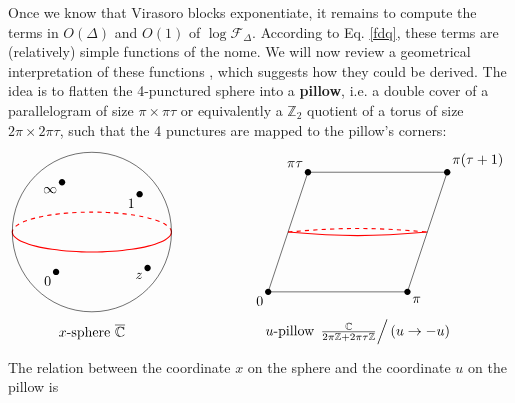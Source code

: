 \documentclass[12pt, a4paper]{article}
\newcommand{\myindex}[1]{\textbf{\boldmath #1}}
\begin{document}
Once we know that Virasoro blocks exponentiate, it remains to compute the terms in $O(\Delta)$ and $O(1)$ of $\log \mathcal{F}_\Delta$. According to Eq. \eqref{fdq}, these terms are (relatively) simple functions of the nome. We will now review a geometrical interpretation of these functions \cite{msz15}, which suggests how they could be derived. The idea is to flatten the 4-punctured sphere into a \myindex{pillow}, i.e. a double cover of a parallelogram of size $\pi\times \pi \tau$ or equivalently a $\mathbb{Z}_2$ quotient of a torus of size $2\pi\times 2\pi\tau$, such that the 4 punctures are mapped to the pillow's corners:
\begin{align}
 \begin{tikzpicture}[scale = .5, baseline=(base)]
 \coordinate (base) at (0, 0);
  \draw [thick, red] plot [domain = 0:-180, smooth] ({4*cos(\x)}, {sin(\x)});
  \draw [thick, red, dashed] plot [domain = 0:180, smooth] ({4*cos(\x)}, {sin(\x)});
  \draw (0, 0) circle [radius = 4];
  \draw (-1.8,-2) node [fill, circle, minimum size = 1.6mm, inner sep = 0]{} node[below left] {$0$};
  \draw (2.8, -1.8) node [fill, circle, minimum size = 1.6mm, inner sep = 0]{} node[below left] {$z$};
  \draw (-1.5, 2.5) node [fill, circle, minimum size = 1.6mm, inner sep = 0]{} node[below left] {$\infty$};
  \draw (2.4, 1.9) node [fill, circle, minimum size = 1.6mm, inner sep = 0]{} node[below left] {$1$};
  \draw (0, -5) node {$x$-sphere $\overline{\mathbb{C}}$};
 \end{tikzpicture}
 \hspace{2cm}
 \begin{tikzpicture}[scale = .5, baseline=(base)]
 \coordinate (base) at (0, 0);
  \draw [thick, red] (-3, 0) to [out = -5, in = -175] (4, 0);
   \draw [thick, red, dashed] (-3, 0) to [out = 5, in = 175] (4, 0);
  \draw (-4, -3) node [below left] {$0$} node [fill, circle, minimum size = 1.6mm, inner sep = 0]{} -- (-2,3) node [above left] {$\pi\tau$} node [fill, circle, minimum size = 1.6mm, inner sep = 0]{} -- (5, 3) node [above right] {$\pi(\tau +1)$} node [fill, circle, minimum size = 1.6mm, inner sep = 0]{} -- (3, -3) node [below right] {$\pi$} node [fill, circle, minimum size = 1.6mm, inner sep = 0]{} -- cycle; 
  \draw (.5, -5) node {$u$-pillow $\left. \frac{\mathbb{C}}{2\pi\mathbb{Z}+2\pi\tau\mathbb{Z}}\right/\left(u\to -u\right)$};
 \end{tikzpicture}
 \label{fig:pillow}
\end{align}
The relation between the coordinate $x$ on the sphere and the coordinate $u$ on the pillow is 
\end{document}
